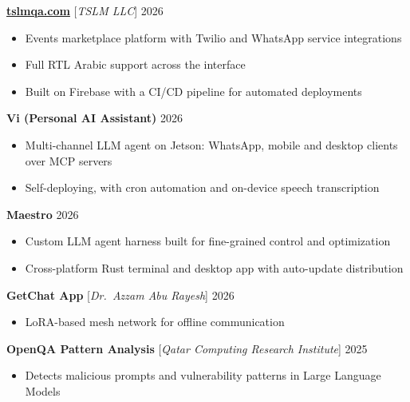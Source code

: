 \documentclass[11pt,a4paper]{article}
\begin{document}
\vspace{2pt}

\textbf{\href{https://tslmqa.com}{tslmqa.com}} [\textit{TSLM LLC}] \hfill 2026
\begin{itemize}[leftmargin=2em, nosep, label={}]
    \item Events marketplace platform with Twilio and WhatsApp service integrations
    \item Full RTL Arabic support across the interface
    \item Built on Firebase with a CI/CD pipeline for automated deployments
\end{itemize}

\vspace{2pt}

\textbf{Vi (Personal AI Assistant)} \hfill 2026
\begin{itemize}[leftmargin=2em, nosep, label={}]
    \item Multi-channel LLM agent on Jetson: WhatsApp, mobile and desktop clients over MCP servers
    \item Self-deploying, with cron automation and on-device speech transcription
\end{itemize}

\vspace{2pt}

\textbf{Maestro} \hfill 2026
\begin{itemize}[leftmargin=2em, nosep, label={}]
    \item Custom LLM agent harness built for fine-grained control and optimization
    \item Cross-platform Rust terminal and desktop app with auto-update distribution
\end{itemize}

\vspace{2pt}

\textbf{GetChat App} [\textit{Dr.\ Azzam Abu Rayesh}] \hfill 2026
\begin{itemize}[leftmargin=2em, nosep, label={}]
    \item LoRA-based mesh network for offline communication
\end{itemize}

\vspace{2pt}

\textbf{OpenQA Pattern Analysis} [\textit{Qatar Computing Research Institute}] \hfill 2025
\begin{itemize}[leftmargin=2em, nosep, label={}]
    \item Detects malicious prompts and vulnerability patterns in Large Language Models
\end{itemize}
\end{document}
